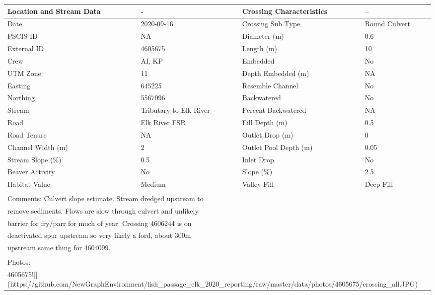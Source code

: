 \documentclass[
]{book}
\begin{document}
\begin{tabular}{l|l|l|l}
\hline
Location and Stream Data & - & Crossing Characteristics & --\\
\hline
Date & 2020-09-16 & Crossing Sub Type & Round Culvert\\
\hline
PSCIS ID & NA & Diameter (m) & 0.6\\
\hline
External ID & 4605675 & Length (m) & 10\\
\hline
Crew & AI, KP & Embedded & No\\
\hline
UTM Zone & 11 & Depth Embedded (m) & NA\\
\hline
Easting & 645225 & Resemble Channel & No\\
\hline
Northing & 5567096 & Backwatered & No\\
\hline
Stream & Tributary to Elk River & Percent Backwatered & NA\\
\hline
Road & Elk River FSR & Fill Depth (m) & 0.5\\
\hline
Road Tenure & NA & Outlet Drop (m) & 0\\
\hline
Channel Width (m) & 2 & Outlet Pool Depth (m) & 0.05\\
\hline
Stream Slope (\%) & 0.5 & Inlet Drop & No\\
\hline
Beaver Activity & No & Slope (\%) & 2.5\\
\hline
Habitat Value & Medium & Valley Fill & Deep Fill\\
\hline
\multicolumn{4}{l}{\textsuperscript{} Comments: Culvert slope estimate. Stream dredged upstream to}\\
\multicolumn{4}{l}{remove sediments. Flows are slow through culvert and unlikely}\\
\multicolumn{4}{l}{barrier for fry/parr for much of year. Crossing 4606244 is on}\\
\multicolumn{4}{l}{deactivated spur upstream so very likely a ford, about 300m}\\
\multicolumn{4}{l}{upstream same thing for 4604099.}\\
\multicolumn{4}{l}{\textsuperscript{} Photos:}\\
\multicolumn{4}{l}{4605675![](https://github.com/NewGraphEnvironment/fish\_passage\_elk\_2020\_reporting/raw/master/data/photos/4605675/crossing\_all.JPG)}\\
\end{tabular}
\end{document}
